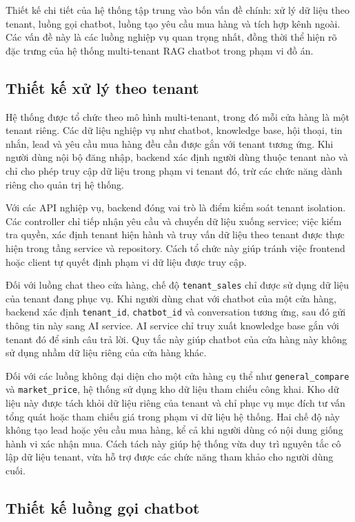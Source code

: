 \documentclass[../DoAn.tex]{subfiles}
\begin{document}
Thiết kế chi tiết của hệ thống tập trung vào bốn vấn đề chính: xử lý dữ liệu theo tenant, luồng gọi chatbot, luồng tạo yêu cầu mua hàng và tích hợp kênh ngoài. Các vấn đề này là các luồng nghiệp vụ quan trọng nhất, đồng thời thể hiện rõ đặc trưng của hệ thống multi-tenant RAG chatbot trong phạm vi đồ án.

\subsection{Thiết kế xử lý theo tenant}

Hệ thống được tổ chức theo mô hình multi-tenant, trong đó mỗi cửa hàng là một tenant riêng. Các dữ liệu nghiệp vụ như chatbot, knowledge base, hội thoại, tin nhắn, lead và yêu cầu mua hàng đều cần được gắn với tenant tương ứng. Khi người dùng nội bộ đăng nhập, backend xác định người dùng thuộc tenant nào và chỉ cho phép truy cập dữ liệu trong phạm vi tenant đó, trừ các chức năng dành riêng cho quản trị hệ thống.

Với các API nghiệp vụ, backend đóng vai trò là điểm kiểm soát tenant isolation. Các controller chỉ tiếp nhận yêu cầu và chuyển dữ liệu xuống service; việc kiểm tra quyền, xác định tenant hiện hành và truy vấn dữ liệu theo tenant được thực hiện trong tầng service và repository. Cách tổ chức này giúp tránh việc frontend hoặc client tự quyết định phạm vi dữ liệu được truy cập.

Đối với luồng chat theo cửa hàng, chế độ \texttt{tenant\_sales} chỉ được sử dụng dữ liệu của tenant đang phục vụ. Khi người dùng chat với chatbot của một cửa hàng, backend xác định \texttt{tenant\_id}, \texttt{chatbot\_id} và conversation tương ứng, sau đó gửi thông tin này sang AI service. AI service chỉ truy xuất knowledge base gắn với tenant đó để sinh câu trả lời. Quy tắc này giúp chatbot của cửa hàng này không sử dụng nhầm dữ liệu riêng của cửa hàng khác.

Đối với các luồng không đại diện cho một cửa hàng cụ thể như \texttt{general\_compare} và \texttt{market\_price}, hệ thống sử dụng kho dữ liệu tham chiếu công khai. Kho dữ liệu này được tách khỏi dữ liệu riêng của tenant và chỉ phục vụ mục đích tư vấn tổng quát hoặc tham chiếu giá trong phạm vi dữ liệu hệ thống. Hai chế độ này không tạo lead hoặc yêu cầu mua hàng, kể cả khi người dùng có nội dung giống hành vi xác nhận mua. Cách tách này giúp hệ thống vừa duy trì nguyên tắc cô lập dữ liệu tenant, vừa hỗ trợ được các chức năng tham khảo cho người dùng cuối.

\subsection{Thiết kế luồng gọi chatbot}
\end{document}
